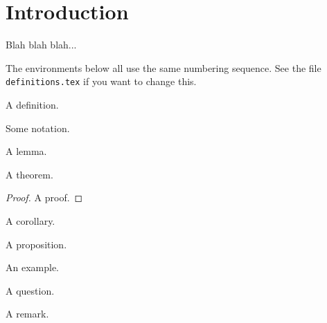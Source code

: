 
\chapter{Introduction}
\label{chp:Introduction}



Blah blah blah...

The environments below all use the same numbering sequence.  See
the file \verb+definitions.tex+ if you want to change this.

\begin{defn}
A definition.
\end{defn}

\begin{notn}
Some notation.
\end{notn}

\begin{lemma}
A lemma.
\end{lemma}

\begin{theorem}
A theorem.
\end{theorem}

\begin{proof}
A proof.
\end{proof}

\begin{cor}
A corollary.
\end{cor}

\begin{prop}
A proposition.
\end{prop}

\begin{ex}
An example.
\end{ex}

\begin{question}
A question.
\end{question}

\begin{remark}
A remark.
\end{remark}

